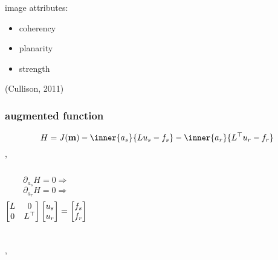 \begin{frame}
  \begin{columns}
  \end{columns}
\end{frame}

\begin{frame} 
\end{frame}

\begin{frame} 
\end{frame}


\begin{frame}
  image attributes:
  \begin{itemize}
    \item coherency
    \item planarity
    \item strength
  \end{itemize}
  
  \begin{flushright}
  (Cullison, 2011)
  \end{flushright}
\end{frame}



\begin{frame}\frametitle{augmented function}
\[
  H = J(\m) - \inner{a_s}{Lu_s - f_s} -\inner{a_r}{L^\top u_r - f_r}
\]
\sep

\end{frame}


\begin{frame}
  \begin{columns}
      \vfill
      \[\partial_{a_s} H=0\Rightarrow \]
      \[\partial_{a_r} H=0\Rightarrow \]
      \vfill
    \vfill
    \[
     \begin{bmatrix}
       L & 0          \\
       0 & L^\top
     \end{bmatrix}
     \begin{bmatrix}
       {u_s} \\ 
       {u_r} 
     \end{bmatrix}
    =
    \begin{bmatrix}
       f_s \\ 
       f_r 
    \end{bmatrix}
    \]
    \vfill
  \end{columns}
  \sep
\end{frame}

